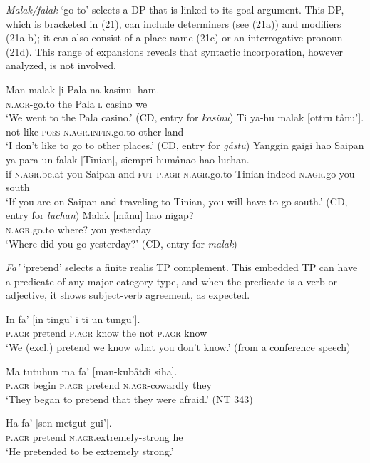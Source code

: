 \documentclass[output=paper,
modfonts
]{LSP/langsci}
\begin{document}
\begin{exe}
\begin{xlist}
\emph{Malak/falak} `go to' selects a DP that is linked to its goal
argument. This DP, which is bracketed in (21), can include determiners
(see (21a)) and modifiers (21a-b); it can also consist of a place name
(21c) or an interrogative pronoun (21d). This range of expansions
reveals that syntactic incorporation, however analyzed, is not involved.

\ea
	\ea \gll  Man-malak {[}i Pala na kasinu{]} ham.\\
		\textsc{n.agr-}go.to the Pala \textsc{l} casino we\\
		\glt `We went to the Pala casino.' (CD, entry for \emph{kasinu})
	\ex \gll Ti ya-hu malak {[}ottru tånu'{]}.\\
		not like-\textsc{poss} \textsc{n.agr.infin.}go.to other land\\
		\glt `I don't like to go to other places.' (CD, entry for \emph{gåstu})
	\ex \gll Yanggin gaigi hao Saipan ya para un falak {[}Tinian{]}, siempri humånao hao luchan.\\
		if \textsc{n.agr.}be.at you Saipan and \textsc{fut} \textsc{p.agr} \textsc{n.agr.}go.to
		Tinian indeed \textsc{n.agr.}go you south\\
		\glt `If you are on Saipan and traveling to Tinian, you will have to go
		south.' (CD, entry for \emph{luchan})
	\ex \gll Malak {[}månu{]} hao nigap?\\
		\textsc{n.agr.}go.to where? you yesterday\\
		\glt `Where did you go yesterday?' (CD, entry for \emph{malak})
	\z
\z

\emph{Fa'} `pretend' selects a finite realis TP complement. This
embedded TP can have a predicate of any major category type, and when
the predicate is a verb or adjective, it shows subject-verb agreement,
as expected.

\ea
\ea \gll In fa' {[}in tingu' i ti un tungu'{]}.\\
\textsc{p.agr} pretend \textsc{p.agr} know the not \textsc{p.agr} know\\
\glt `We (excl.) pretend we know what you don't know.' (from a conference speech)

\ex \gll Ma tutuhun ma fa' {[}man-kubåtdi siha{]}.\\
\textsc{p.agr} begin \textsc{p.agr} pretend \textsc{n.agr-}cowardly they\\
\glt `They began to pretend that they were afraid.' (NT 343)

\ex \gll Ha fa' {[}sen-metgut gui'{]}.\\
\textsc{p.agr} pretend \textsc{n.agr.}extremely-strong he\\
\glt `He pretended to be extremely strong.'


\end{xlist}
\end{exe}
\end{document}
